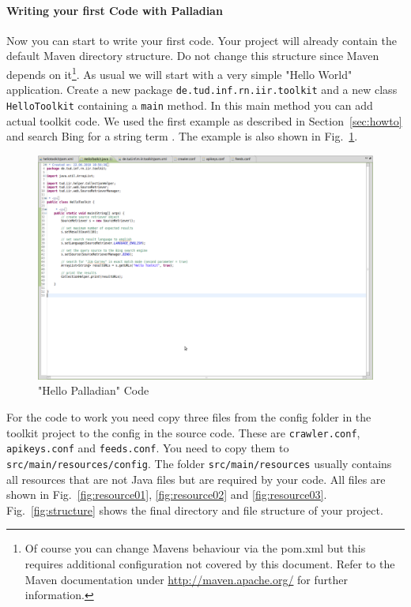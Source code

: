 \paragraph{Writing your first Code with Palladian} Now you can start to write your first code. Your project will already contain the default Maven directory structure. Do not change this structure since Maven depends on it\footnote{Of course you can change Mavens behaviour via the pom.xml but this requires additional configuration not covered by this document. Refer to the Maven documentation under \url{http://maven.apache.org/} for further information.}. As usual we will start with a very simple "Hello World" application. Create a new package \texttt{de.tud.inf.rn.iir.toolkit} and a new class \texttt{HelloToolkit} containing a \texttt{main} method. In this main method you can add actual toolkit code. We used the first example as described in Section~\ref{sec:howto} and search Bing for a string term . The example is also shown in Fig.~\ref{fig:hellotoolkit}.
\begin{figure}
\centering
\includegraphics[trim=0 350px 600px 0,clip=true,width=\textwidth]{img/ht10.png}
\caption{"Hello Palladian" Code}
\label{fig:hellotoolkit}
\end{figure}
For the code to work you need copy three files from the config folder in the toolkit project to the config in the source code. These are \texttt{crawler.conf}, \texttt{apikeys.conf} and \texttt{feeds.conf}. You need to copy them to \texttt{src/main/resources/config}. The folder \texttt{src/main/resources} usually contains all resources that are not Java files but are required by your code. All files are shown in Fig.~\ref{fig:resource01}, \ref{fig:resource02} and \ref{fig:resource03}. Fig.~\ref{fig:structure} shows the final directory and file structure of your project.


